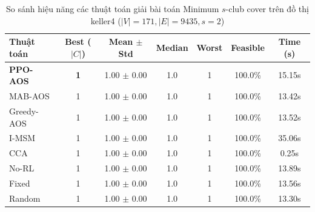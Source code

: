 \begin{table}[htbp]
\centering
\caption{So sánh hiệu năng các thuật toán giải bài toán Minimum $s$-club cover trên đồ thị keller4 ($|V|=171, |E|=9435, s=2$)}
\label{tab:results_keller4}
\begin{tabular}{lcccccc}
\hline
\textbf{Thuật toán} & \textbf{Best ($|C|$)} & \textbf{Mean $\pm$ Std} & \textbf{Median} & \textbf{Worst} & \textbf{Feasible} & \textbf{Time (s)} \\
\hline
\textbf{PPO-AOS} & \textbf{1} & 1.00 $\pm$ 0.00 & 1.0 & 1 & 100.0\% & 15.15s \\
MAB-AOS & 1 & 1.00 $\pm$ 0.00 & 1.0 & 1 & 100.0\% & 13.42s \\
Greedy-AOS & 1 & 1.00 $\pm$ 0.00 & 1.0 & 1 & 100.0\% & 13.52s \\
I-MSM & 1 & 1.00 $\pm$ 0.00 & 1.0 & 1 & 100.0\% & 35.06s \\
CCA & 1 & 1.00 $\pm$ 0.00 & 1.0 & 1 & 100.0\% & 0.25s \\
No-RL & 1 & 1.00 $\pm$ 0.00 & 1.0 & 1 & 100.0\% & 13.89s \\
Fixed & 1 & 1.00 $\pm$ 0.00 & 1.0 & 1 & 100.0\% & 13.56s \\
Random & 1 & 1.00 $\pm$ 0.00 & 1.0 & 1 & 100.0\% & 13.30s \\
\hline
\end{tabular}
\end{table}

